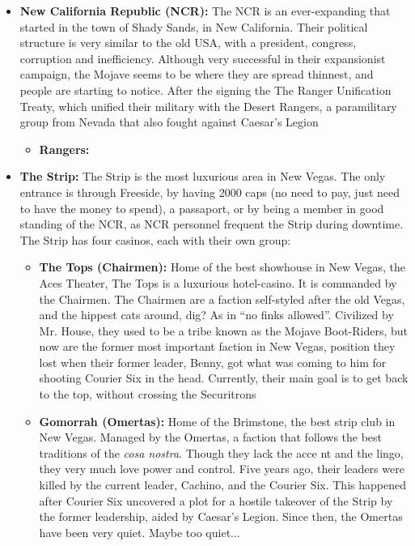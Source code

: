 \documentclass[11pt]{article} %
\begin{document}
\begin{itemize}
\item \textbf{New California Republic (NCR):} The NCR is an ever-expanding that started in the town of Shady Sands, in New California. Their political structure is very similar to the old USA, with a president, congress, corruption and inefficiency. Although very successful in their expansionist campaign, the Mojave seems to be where they are spread thinnest, and people are starting to notice. After the signing the The Ranger Unification Treaty, which unified their military with the Desert Rangers, a paramilitary group from Nevada that also fought against Caesar's Legion
\begin{itemize}
\item \textbf{Rangers:} 
\end{itemize}

\item \textbf{The Strip:} The Strip is the most luxurious area in New Vegas. The only entrance is through Freeside, by having 2000 caps (no need to pay, just need to have the money to spend), a passaport, or by being a member in good standing of the NCR, as NCR personnel frequent the Strip during downtime. The Strip has four casinos, each with their own group:

\begin{itemize}
\item \textbf{The Tops (Chairmen):} Home of the best showhouse in New Vegas, the Aces Theater, The Tops is a luxurious hotel-casino. It is commanded by the Chairmen. The Chairmen are a faction self-styled after the old Vegas, and the hippest cats around, dig? As in ``no finks allowed''. Civilized by Mr. House, they used to be a tribe known as the Mojave Boot-Riders, but now are the former most important faction in New Vegas, position they lost when their former leader, Benny, got what was coming to him for shooting Courier Six in the head. Currently, their main goal is to get back to the top, without crossing the Securitrons

\item \textbf{Gomorrah (Omertas):} Home of the Brimstone, the best strip club in New Vegas. Managed by the Omertas, a faction that follows the best traditions of the \textit{cosa nostra}. Though they lack the acce nt and the lingo, they very much love power and control. Five years ago, their leaders were killed by the current leader, Cachino, and the Courier Six. This happened after Courier Six uncovered a plot for a hostile takeover of the Strip by the former leadership, aided by Caesar's Legion. Since then, the Omertas have been very quiet. Maybe too quiet...


\end{itemize}
\end{itemize}
\end{document}
